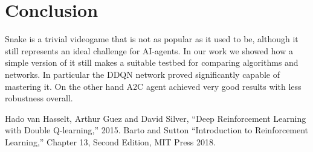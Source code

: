 \documentclass[conference]{IEEEtran}
\begin{document}
\section{Conclusion}
Snake is a trivial videogame that is not as popular as it used to be, although it still represents an ideal challenge for AI-agents. In our work we showed how a simple version
of it still makes a suitable testbed for comparing algorithms and networks. In particular the DDQN network proved significantly capable of mastering it. On the other
hand A2C agent achieved very good results with less robustness overall.

\nocite{*}
\begin{thebibliography}{00}
 Hado van Hasselt, Arthur Guez and David Silver, ``Deep Reinforcement Learning with Double Q-learning,'' 2015.
 Barto and Sutton ``Introduction to Reinforcement Learning,'' Chapter 13, Second Edition, MIT Press 2018.
\end{thebibliography}
\end{document}
